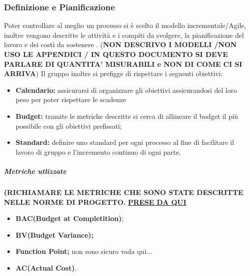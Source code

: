 \subsubsection{Definizione e Pianificazione}
Poter controllare al meglio un processo si è scelto il modello incrementale/Agile, inoltre vengono descritte le attività e i compiti da svolgere, la pianificazione del lavoro e dei costi da sostenere . (\textbf{NON DESCRIVO I MODELLI /NON USO LE APPENDICI / IN QUESTO DOCUMENTO SI DEVE PARLARE DI QUANTITA' MISURABILI e NON DI COME CI SI ARRIVA}) Il gruppo inoltre si prefigge di rispettare i seguenti obiettivi:
\begin{itemize}
		\item{\textbf{Calendario:} assicurarsi di organizzare gli obiettivi assicurandosi del loro peso per poter rispettare le scadenze}
		\item{\textbf{Budget:} tramite le metriche descritte si cerca di allineare il budget il più possibile con gli obiettivi prefissati;}
		\item{\textbf{Standard:} definire uno standard per ogni processo al fine di facilitare il lavoro di gruppo e l'incremento continuo di ogni parte.}
\end{itemize} 
\subparagraph{Metriche utlizzate}
\textbf{(RICHIAMARE LE METRICHE CHE SONO STATE DESCRITTE NELLE NORME DI PROGETTO.}
\href{https://it.wikipedia.org/wiki/Metriche_di_progetto}{\textbf{PRESE DA QUI}}
\begin{itemize}
	\item{\textbf{BAC(Budget at Completition)};}
	\item{\textbf{BV(Budget Variance);}}
	\item{\textbf{Function Point;} non sono sicuro vada qui...}
	\item{\textbf{AC(Actual Cost)}.}
\end{itemize}
\begin{table}[!htpb]
\end{table}

